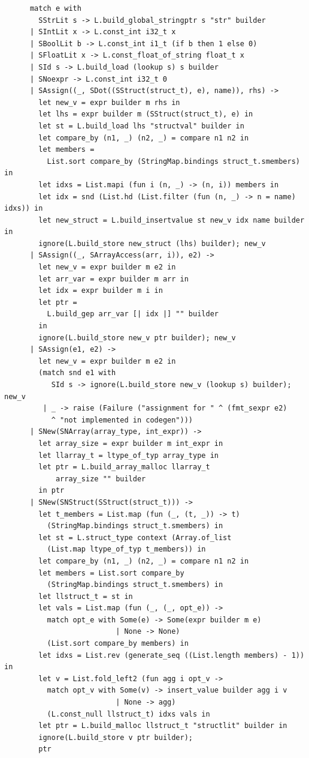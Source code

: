 \documentclass[12pt]{article}
\begin{document}
\begin{mdframed}[hidealllines=true,backgroundcolor=blue!20]
\begin{lstlisting}
      match e with
        SStrLit s -> L.build_global_stringptr s "str" builder
      | SIntLit x -> L.const_int i32_t x
      | SBoolLit b -> L.const_int i1_t (if b then 1 else 0)
      | SFloatLit x -> L.const_float_of_string float_t x
      | SId s -> L.build_load (lookup s) s builder
      | SNoexpr -> L.const_int i32_t 0
      | SAssign((_, SDot((SStruct(struct_t), e), name)), rhs) ->
        let new_v = expr builder m rhs in
        let lhs = expr builder m (SStruct(struct_t), e) in
        let st = L.build_load lhs "structval" builder in
        let compare_by (n1, _) (n2, _) = compare n1 n2 in
        let members = 
          List.sort compare_by (StringMap.bindings struct_t.smembers) in
        let idxs = List.mapi (fun i (n, _) -> (n, i)) members in
        let idx = snd (List.hd (List.filter (fun (n, _) -> n = name) idxs)) in
        let new_struct = L.build_insertvalue st new_v idx name builder in
        ignore(L.build_store new_struct (lhs) builder); new_v
      | SAssign((_, SArrayAccess(arr, i)), e2) ->
        let new_v = expr builder m e2 in
        let arr_var = expr builder m arr in
        let idx = expr builder m i in 
        let ptr = 
          L.build_gep arr_var [| idx |] "" builder 
        in 
        ignore(L.build_store new_v ptr builder); new_v
      | SAssign(e1, e2) ->
        let new_v = expr builder m e2 in
        (match snd e1 with
           SId s -> ignore(L.build_store new_v (lookup s) builder); new_v
         | _ -> raise (Failure ("assignment for " ^ (fmt_sexpr e2) 
           ^ "not implemented in codegen")))
      | SNew(SNArray(array_type, int_expr)) ->
        let array_size = expr builder m int_expr in
        let llarray_t = ltype_of_typ array_type in
        let ptr = L.build_array_malloc llarray_t
            array_size "" builder
        in ptr
      | SNew(SNStruct(SStruct(struct_t))) ->
        let t_members = List.map (fun (_, (t, _)) -> t) 
          (StringMap.bindings struct_t.smembers) in
        let st = L.struct_type context (Array.of_list 
          (List.map ltype_of_typ t_members)) in
        let compare_by (n1, _) (n2, _) = compare n1 n2 in
        let members = List.sort compare_by 
          (StringMap.bindings struct_t.smembers) in
        let llstruct_t = st in
        let vals = List.map (fun (_, (_, opt_e)) -> 
          match opt_e with Some(e) -> Some(expr builder m e) 
                          | None -> None) 
          (List.sort compare_by members) in
        let idxs = List.rev (generate_seq ((List.length members) - 1)) in
        let v = List.fold_left2 (fun agg i opt_v -> 
          match opt_v with Some(v) -> insert_value builder agg i v 
                          | None -> agg) 
          (L.const_null llstruct_t) idxs vals in
        let ptr = L.build_malloc llstruct_t "structlit" builder in
        ignore(L.build_store v ptr builder);
        ptr


\end{lstlisting}
\end{mdframed}
\end{document}
